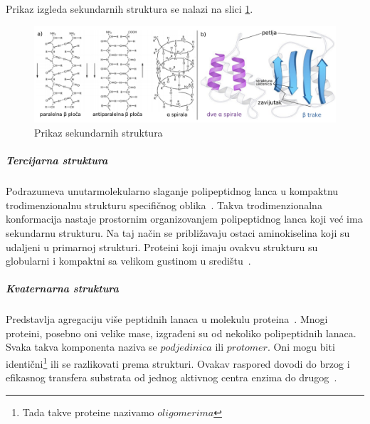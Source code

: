 Prikaz izgleda sekundarnih struktura se nalazi na slici \ref{fig:ab}.
\begin{figure}[h]
	\centering
    \includegraphics[width=1\textwidth]{Figures/BO/sec_structure.png}
    \caption{Prikaz sekundarnih struktura~\cite{Vinterhalter}}
    \label{fig:ab}
\end{figure}
 

\subparagraph{Tercijarna struktura}
Podrazumeva unutarmolekularno slaganje polipeptidnog lanca u kompaktnu trodimenzionalnu strukturu specifičnog oblika~\cite{medbio}.
Takva trodimenzionalna konformacija nastaje prostornim organizovanjem polipeptidnog lanca koji već ima sekundarnu strukturu. Na taj način se približavaju ostaci aminokiselina koji su udaljeni u primarnoj strukturi. Proteini koji imaju ovakvu strukturu su globularni i kompaktni sa velikom gustinom u središtu~\cite{spasic}.
\subparagraph{Kvaternarna struktura}
Predstavlja agregaciju više peptidnih lanaca u molekulu proteina~\cite{medbio}. Mnogi proteini, posebno oni velike mase, izgrađeni su od nekoliko polipeptidnih lanaca. Svaka takva komponenta naziva se $podjedinica$ ili $protomer$. Oni mogu biti identični\footnote{Tada takve proteine nazivamo $oligomerima$} ili se razlikovati prema strukturi. Ovakav raspored dovodi do brzog i efikasnog transfera substrata od jednog aktivnog centra enzima do drugog~\cite{spasic}.
 
